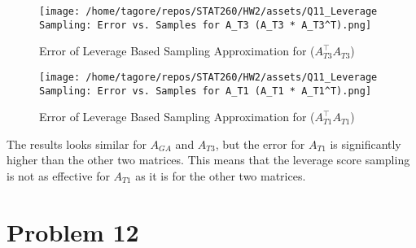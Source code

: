\documentclass{article}
\begin{document}
\begin{figure}[H]
    \centering
    \texttt{[image: /home/tagore/repos/STAT260/HW2/assets/Q11\_Leverage Sampling: Error vs. Samples for A\_T3 (A\_T3 * A\_T3^T).png]}
    \caption{Error of Leverage Based Sampling Approximation for (\(A_{T3}^\top A_{T3}\))}
    \label{fig:T1_leverage_based_error}
\end{figure}

\begin{figure}[H]
    \centering
    \texttt{[image: /home/tagore/repos/STAT260/HW2/assets/Q11\_Leverage Sampling: Error vs. Samples for A\_T1 (A\_T1 * A\_T1^T).png]}
    \caption{Error of Leverage Based Sampling Approximation for (\(A_{T1}^\top A_{T1}\))}
    \label{fig:T3_leverage_based_error}
\end{figure}

The results looks similar for $A_{GA}$ and $A_{T3}$, but the error for $A_{T1}$ is significantly higher than the other two matrices. 
This means that the leverage score sampling is not as effective for $A_{T1}$ as it is for the other two matrices.


\section*{Problem 12}



\end{document}
